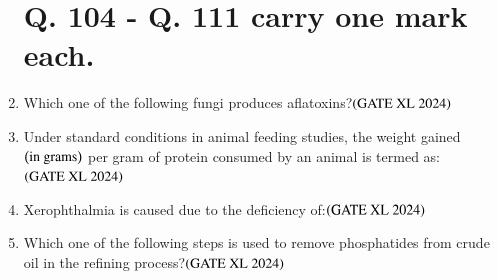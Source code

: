 \documentclass[journal]{IEEEtran}
\begin{document}
\begin{enumerate}
\section*{Q. 104 - Q. 111 carry one mark each.} 
\setcounter{enumi}{103}
    \item Which one of the following fungi produces aflatoxins?\hfill $\left(\text{GATE XL 2024}\right)$
    \begin{enumerate}
    \end{enumerate}

    \item Under standard conditions in animal feeding studies, the weight gained $\left(\text{in grams}\right)$ per gram of protein consumed by an animal is termed as:\hfill $\left(\text{GATE XL 2024}\right)$
    \begin{enumerate}
    \end{enumerate}

    \item Xerophthalmia is caused due to the deficiency of:\hfill $\left(\text{GATE XL 2024}\right)$
    \begin{enumerate}
    \end{enumerate}

    \item Which one of the following steps is used to remove phosphatides from crude oil in the refining process?\hfill $\left(\text{GATE XL 2024}\right)$
    \begin{enumerate}
    \end{enumerate}


\end{enumerate}
\end{document}
